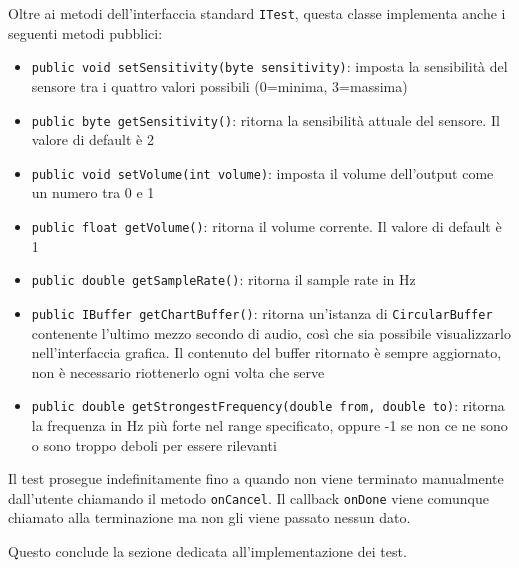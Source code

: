Oltre ai metodi dell'interfaccia standard \texttt{ITest}, questa classe implementa anche i seguenti metodi pubblici: \begin{itemize}
	\item \texttt{public void setSensitivity(byte sensitivity)}: imposta la sensibilità del sensore tra i quattro valori possibili (0=minima, 3=massima)
	\item \texttt{public byte getSensitivity()}: ritorna la sensibilità attuale del sensore. Il valore di default è 2
	\item \texttt{public void setVolume(int volume)}: imposta il volume dell'output come un numero tra 0 e 1
	\item \texttt{public float getVolume()}: ritorna il volume corrente. Il valore di default è 1
	\item \texttt{public double getSampleRate()}: ritorna il sample rate in Hz
	\item \texttt{public IBuffer getChartBuffer()}: ritorna un'istanza di \texttt{CircularBuffer} contenente l'ultimo mezzo secondo di audio, così che sia possibile visualizzarlo nell'interfaccia grafica. Il contenuto del buffer ritornato è sempre aggiornato, non è necessario riottenerlo ogni volta che serve
	\item \texttt{public double getStrongestFrequency(double from, double to)}: ritorna la frequenza in Hz più forte nel range specificato, oppure -1 se non ce ne sono o sono troppo deboli per essere rilevanti
\end{itemize}

Il test prosegue indefinitamente fino a quando non viene terminato manualmente dall'utente chiamando il metodo \texttt{onCancel}. Il callback \texttt{onDone} viene comunque chiamato alla terminazione ma non gli viene passato nessun dato.

%
%
%
Questo conclude la sezione dedicata all'implementazione dei test.
